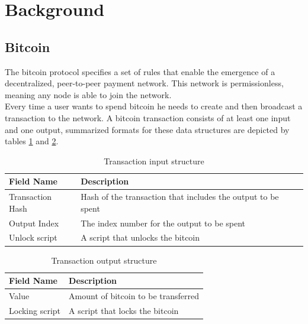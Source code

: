 \section{Background}
\label{sec:background}

\subsection{Bitcoin}
\label{ssection:bitcoin}

The bitcoin protocol \cite{bitcoin-core} specifies a set of rules that enable the emergence of a decentralized, peer-to-peer payment network. This network is permissionless, meaning any node is able to join the network.\\
Every time a user wants to spend bitcoin he needs to create and then broadcast a transaction to the network. A bitcoin transaction consists of at least one input and one output, summarized formats for these data structures are depicted by tables \ref{table:tx_input} and \ref{table:tx_output}.

\begin{table}[H]
\begin{tabular}{|l|l|}
\hline
\rowcolor[HTML]{C0C0C0} 
Field Name & Description \\ \hline
Transaction Hash & Hash of the transaction that includes the output to be spent \\ \hline
Output Index & The index number for the output to be spent \\ \hline
Unlock script & A script that unlocks the bitcoin
\end{tabular}
\caption{Transaction input structure}
\label{table:tx_input}
\end{table}

\begin{table}[H]
\begin{tabular}{|l|l|}
\hline
\rowcolor[HTML]{C0C0C0} 
Field Name & Description \\ \hline
Value & Amount of bitcoin to be transferred \\ \hline
Locking script & A script that locks the bitcoin \\ \hline
\end{tabular}
\caption{Transaction output structure}
\label{table:tx_output}
\end{table}

